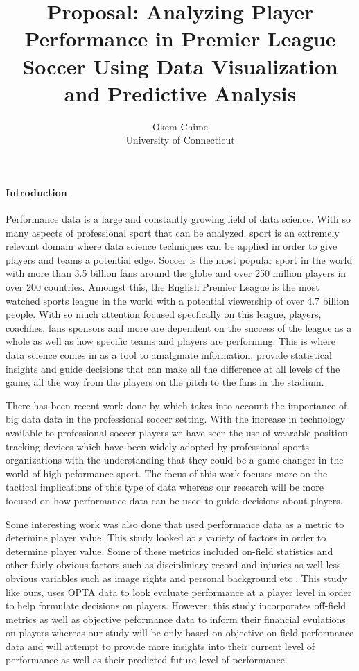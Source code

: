 \documentclass[12pt]{article}
\title{Proposal: Analyzing Player Performance in Premier League Soccer Using 
Data Visualization and Predictive Analysis }
\author{Okem Chime\\
  University of Connecticut
}
\begin{document}
\maketitle

\paragraph{Introduction}
Performance data is a large and constantly growing field of data science. With
so many aspects of professional sport that can be analyzed, sport is an 
extremely relevant domain where data science techniques can be applied in order
to give players and teams a potential edge. Soccer is the most popular sport in
the world with more than 3.5 billion fans around the globe and over 250 million
players in over 200 countries. Amongst this, the English Premier League is the 
most watched sports league in the world with a potential viewership of over 4.7 
billion people. With so much attention focused specfically on this league,
players, coachhes, fans sponsors and more are dependent on the success of the
league as a whole as well as how specific teams and players are performing. 
This is where data science comes in as a tool to amalgmate information,
provide statistical insights and guide decisions that can make all the difference 
at all levels of the game; all the way from the players on the pitch to the fans
in the stadium.

There has been recent work done by \citet{goes2021unlocking} which takes into 
account the importance of big data data in the professional soccer setting. 
With the increase in technology available to professional soccer players we have
seen the use of wearable position tracking devices which have been widely 
adopted by professional sports organizations with the understanding that they
could be a game changer in the world of high peformance sport. The focus of this 
work focuses more on the tactical implications of this type of data whereas
our research will be more focused on how performance data can be used to guide
decisions about players.

Some interesting work was also done that used performance data as a metric to 
determine player value. This study looked at s variety of factors in order to 
determine player value. Some of these metrics included on-field statistics and
other fairly obvious factors such as discipliniary record and injuries as well
less obvious variables such as image rights and personal background etc 
\citep{tunaru2010valuations}. This study like ours, uses OPTA data to look
evaluate performance at a player level in order to help formulate decisions on
players. However, this study incorporates off-field metrics as well as  objective
peformance data to inform their financial evulations on players whereas our
study will be only based on objective on field performance data and will attempt
to provide more insights into their current level of performance as well as
their predicted future level of performance.
\end{document}
